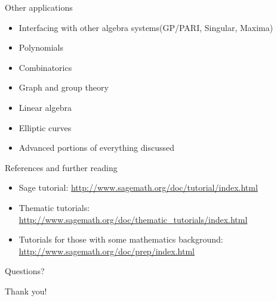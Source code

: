 \documentclass{beamer}
\begin{document}
\begin{frame}{Other applications}
 \begin{itemize}
  \item Interfacing with other algebra systems(GP/PARI, Singular, Maxima)
  \item Polynomials
  \item Combinatorics
  \item Graph and group theory
  \item Linear algebra
  \item Elliptic curves
  \item Advanced portions of everything discussed
 \end{itemize}
\end{frame}

\begin{frame}{References and further reading}
 \begin{itemize}
  \item Sage tutorial: \href{http://www.sagemath.org/doc/tutorial/index.html}{http://www.sagemath.org/doc/tutorial/index.html}
  \item Thematic tutorials: \href{http://www.sagemath.org/doc/thematic\_tutorials/index.html}{http://www.sagemath.org/doc/thematic\_tutorials/index.html}
  \item Tutorials for those with some mathematics background: \href{http://www.sagemath.org/doc/prep/index.html}{http://www.sagemath.org/doc/prep/index.html}
 \end{itemize}
\end{frame}

\begin{frame}
  \begin{center}
    \HUGE Questions?
  \end{center}
\end{frame}

\begin{frame}
  \begin{center}
    \HUGE Thank you!
  \end{center}
\end{frame}
\end{document}
